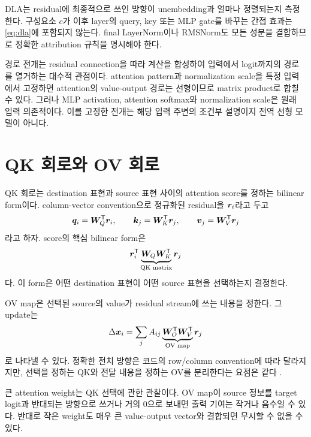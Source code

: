 DLA는 residual에 최종적으로 쓰인 방향이 unembedding과 얼마나 정렬되는지 측정한다.
구성요소 $c$가 이후 layer의 query, key 또는 MLP gate를 바꾸는 간접 효과는 \cref{eq:dla}에 포함되지 않는다.
final LayerNorm이나 RMSNorm도 모든 성분을 결합하므로 정확한 attribution 규칙을 명시해야 한다.

경로 전개는 residual connection을 따라 계산을 합성하여 입력에서 logit까지의 경로를 열거하는 대수적 관점이다.
attention pattern과 normalization scale을 특정 입력에서 고정하면 attention의 value-output 경로는 선형이므로 matrix product로 합칠 수 있다.
그러나 MLP activation, attention softmax와 normalization scale은 원래 입력 의존적이다.
이를 고정한 전개는 해당 입력 주변의 조건부 설명이지 전역 선형 모델이 아니다.

\section{QK 회로와 OV 회로}

QK 회로는 destination 표현과 source 표현 사이의 attention score를 정하는 bilinear form이다.
column-vector convention으로 정규화된 residual을 $\bm{r}_i$라고 두고
\begin{equation}
  \bm{q}_i=\bm{W}_Q^{\mathsf T}\bm{r}_i,\qquad
  \bm{k}_j=\bm{W}_K^{\mathsf T}\bm{r}_j,\qquad
  \bm{v}_j=\bm{W}_V^{\mathsf T}\bm{r}_j
\end{equation}
라고 하자.
score의 핵심 bilinear form은
\begin{equation}
  \bm{r}_i^{\mathsf T}
  \underbrace{\bm{W}_Q\bm{W}_K^{\mathsf T}}_{\text{QK matrix}}
  \bm{r}_j
\end{equation}
다.
이 form은 어떤 destination 표현이 어떤 source 표현을 선택하는지 결정한다.

OV map은 선택된 source의 value가 residual stream에 쓰는 내용을 정한다.
그 update는
\begin{equation}
  \Delta\bm{x}_i=\sum_j A_{ij}
  \underbrace{\bm{W}_O^{\mathsf T}\bm{W}_V^{\mathsf T}}_{\text{OV map}}
  \bm{r}_j
\end{equation}
로 나타낼 수 있다.
정확한 전치 방향은 코드의 row/column convention에 따라 달라지지만, 선택을 정하는 QK와 전달 내용을 정하는 OV를 분리한다는 요점은 같다 \citep{elhage2021framework}.

큰 attention weight는 QK 선택에 관한 관찰이다.
OV map이 source 정보를 target logit과 반대되는 방향으로 쓰거나 거의 0으로 보내면 출력 기여는 작거나 음수일 수 있다.
반대로 작은 weight도 매우 큰 value-output vector와 결합되면 무시할 수 없을 수 있다.

